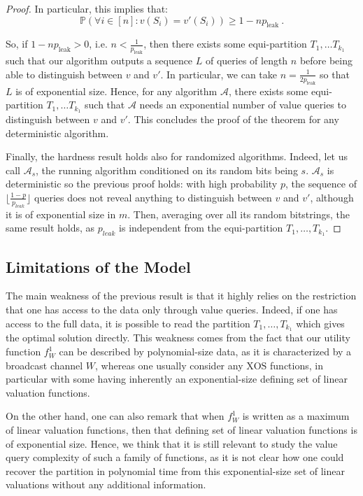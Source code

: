\begin{proof}
    In particular, this implies that:
    \[ \mathbb{P}\left( \forall i \in [n] : v(S_i) = v'(S_i) \right) \geq 1 - np_{\text{leak}} \ . \]

    So, if $1 - np_{\text{leak}} > 0$, i.e. $n < \frac{1}{p_{\text{leak}}}$, then there exists some equi-partition $T_1, \ldots T_{k_1}$ such that our algorithm outputs a sequence $L$ of queries of length $n$ before being able to distinguish between $v$ and $v'$. In particular, we can take $n = \frac{1}{2p_{\text{leak}}}$ so that $L$ is of exponential size. Hence, for any algorithm $\mathcal{A}$, there exists some equi-partition $T_1, \ldots T_{k_1}$ such that $\mathcal{A}$ needs an exponential number of value queries to distinguish between $v$ and $v'$. This concludes the proof of the theorem for any deterministic algorithm.

    Finally, the hardness result holds also for randomized algorithms. Indeed, let us call $\mathcal{A}_s$, the running algorithm conditioned on its random bits being $s$. $\mathcal{A}_s$ is deterministic so the previous proof holds: with high probability $p$, the sequence of $\lfloor\frac{1-p}{p_{leak}}\rfloor$ queries does not reveal anything to distinguish between $v$ and $v'$, although it is of exponential size in $m$. Then, averaging over all its random bitstrings, the same result holds, as $p_{leak}$ is independent from the equi-partition $T_1, \ldots, T_{k_1}$.
\end{proof}

\subsection{Limitations of the Model}
The main weakness of the previous result is that it highly relies on the restriction that one has access to the data only through value queries. Indeed, if one has access to the full data, it is possible to read the partition $T_1, \ldots, T_{k_1}$ which gives the optimal solution directly. This weakness comes from the fact that our utility function $f_W^1$ can be described by polynomial-size data, as it is characterized by a broadcast channel $W$, whereas one usually consider any $\textrm{XOS}$ functions, in particular with some having inherently an exponential-size defining set of linear valuation functions.

On the other hand, one can also remark that when $f_W^1$ is written as a maximum of linear valuation functions, then that defining set of linear valuation functions is of exponential size. Hence, we think that it is still relevant to study the value query complexity of such a family of functions, as it is not clear how one could recover the partition in polynomial time from this exponential-size set of linear valuations without any additional information.

